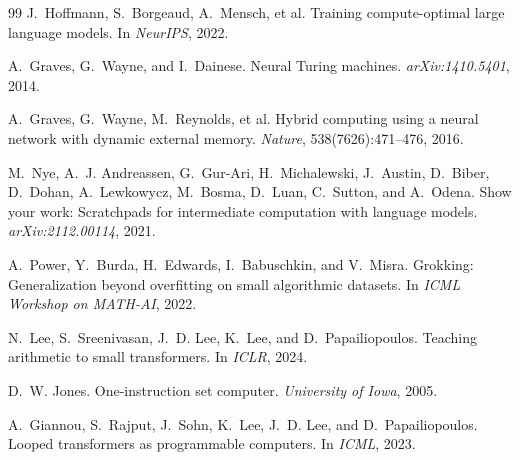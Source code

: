 \documentclass[11pt,a4paper]{article}
\begin{document}
\begin{thebibliography}{99}
J.~Hoffmann, S.~Borgeaud, A.~Mensch, et al.
\newblock Training compute-optimal large language models.
\newblock In \emph{NeurIPS}, 2022.

A.~Graves, G.~Wayne, and I.~Dainese.
\newblock Neural Turing machines.
\newblock \emph{arXiv:1410.5401}, 2014.

A.~Graves, G.~Wayne, M.~Reynolds, et al.
\newblock Hybrid computing using a neural network with dynamic external memory.
\newblock \emph{Nature}, 538(7626):471--476, 2016.

M.~Nye, A.~J. Andreassen, G.~Gur-Ari, H.~Michalewski, J.~Austin, D.~Biber, D.~Dohan, A.~Lewkowycz, M.~Bosma, D.~Luan, C.~Sutton, and A.~Odena.
\newblock Show your work: Scratchpads for intermediate computation with language models.
\newblock \emph{arXiv:2112.00114}, 2021.

A.~Power, Y.~Burda, H.~Edwards, I.~Babuschkin, and V.~Misra.
\newblock Grokking: Generalization beyond overfitting on small algorithmic datasets.
\newblock In \emph{ICML Workshop on MATH-AI}, 2022.

N.~Lee, S.~Sreenivasan, J.~D. Lee, K.~Lee, and D.~Papailiopoulos.
\newblock Teaching arithmetic to small transformers.
\newblock In \emph{ICLR}, 2024.

D.~W. Jones.
\newblock One-instruction set computer.
\newblock \emph{University of Iowa}, 2005.

A.~Giannou, S.~Rajput, J.~Sohn, K.~Lee, J.~D. Lee, and D.~Papailiopoulos.
\newblock Looped transformers as programmable computers.
\newblock In \emph{ICML}, 2023.

\end{thebibliography}
\end{document}
